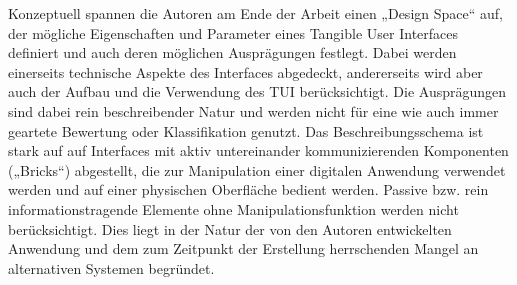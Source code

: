 Konzeptuell spannen die Autoren am Ende der Arbeit einen „Design Space“ auf, der mögliche Eigenschaften und Parameter eines Tangible User Interfaces definiert und auch deren möglichen Ausprägungen festlegt. Dabei werden einerseits technische Aspekte des Interfaces abgedeckt, andererseits wird aber auch der Aufbau und die Verwendung des \gls{TUI} berücksichtigt. Die Ausprägungen sind dabei rein beschreibender Natur und werden nicht für eine wie auch immer geartete Bewertung oder Klassifikation genutzt. Das Beschreibungsschema ist stark auf auf Interfaces mit aktiv untereinander kommunizierenden Komponenten („Bricks“) abgestellt, die zur Manipulation einer digitalen Anwendung verwendet werden und auf einer physischen Oberfläche bedient werden. Passive bzw. rein informationstragende Elemente ohne Manipulationsfunktion werden nicht berücksichtigt. Dies liegt in der Natur der von den Autoren entwickelten Anwendung und dem zum Zeitpunkt der Erstellung herrschenden Mangel an alternativen Systemen begründet.


